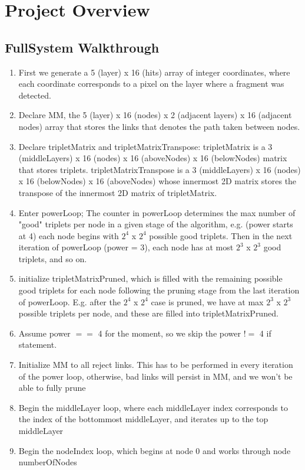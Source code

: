 \documentclass[11pt]{article}
\begin{document}
\tableofcontents
\section{Project Overview}
\subsection{FullSystem Walkthrough}
\begin{enumerate}
	\item First we generate a 5 (layer) x 16 (hits) array of integer coordinates, where each coordinate corresponds to a pixel on the layer where a fragment was detected.
	\item Declare MM, the 5 (layer) x 16 (nodes) x 2 (adjacent layers) x 16 (adjacent nodes) array that stores the links that denotes the path taken between nodes.
	\item Declare tripletMatrix and tripletMatrixTranspose: tripletMatrix is a 3 (middleLayers) x 16 (nodes) x 16 (aboveNodes) x 16 (belowNodes) matrix that stores triplets. tripletMatrixTranspose is a 3 (middleLayers) x 16 (nodes) x 16 (belowNodes) x 16 (aboveNodes) whose innermost 2D matrix stores the transpose of the innermost 2D matrix of tripletMatrix.
	\item Enter powerLoop; The counter in powerLoop determines the max number of "good" triplets per node in a given stage of the algorithm, e.g. (power starts at 4) each node begins with $2^4$ x $2^4$ possible good triplets. Then in the next iteration of powerLoop (power = 3), each node has at most $2^3$ x $2^3$ good triplets, and so on. 
	\item initialize tripletMatrixPruned, which is filled with the remaining possible good triplets for each node following the pruning stage from the last iteration of powerLoop. E.g. after the $2^4$ x $2^4$ case is pruned, we have at max $2^3$ x $2^3$ possible triplets per node, and these are filled into tripletMatrixPruned. 
	\item Assume power $==$ 4 for the moment, so we skip the power $!=$ 4 if statement.
	\item Initialize MM to all reject links. This has to be performed in every iteration of the power loop, otherwise, bad links will persist in MM, and we won't be able to fully prune
	\item Begin the middleLayer loop, where each middleLayer index corresponds to the index of the bottommost middleLayer, and iterates up to the top middleLayer
	\item Begin the nodeIndex loop, which begins at node 0 and works through node numberOfNodes

\end{enumerate}
\end{document}
